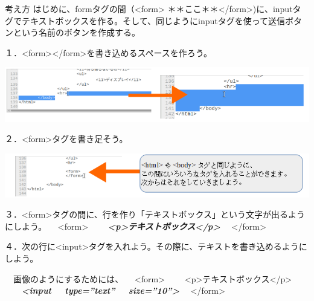 \documentclass[a4paper,12pt,dvipdfmx]{jarticle}
\begin{document}
考え方\newline
はじめに、formタグの間（{\textless}form{\textgreater}
＊＊ここ＊＊{\textless}/form{\textgreater})に、inputタグでテキストボックスを作る。そして、同じようにinputタグを使って送信ボタンという名前のボタンを作成する。

１．{\textless}form{\textgreater}{\textless}/form{\textgreater}を書き込めるスペースを作ろう。



\centering
\includegraphics[width=17.006cm]{ome7-img035.png}
\flushleft

２．{\textless}form{\textgreater}タグを書き足そう。



\centering
\includegraphics[width=17.006cm]{ome7-img036.png}
\flushleft


\bigskip


\bigskip

３．{\textless}form{\textgreater}タグの間に、行を作り「テキストボックス」という文字が出るようにしよう。\newline
\ \ {\textless}form{\textgreater}\newline
\ \ \ \ \textbf{\textit{{\textless}p{\textgreater}テキストボックス{\textless}/p{\textgreater}}}\newline
\ \ {\textless}/form{\textgreater}

４．次の行に{\textless}input{\textgreater}タグを入れよう。その際に、テキストを書き込めるようにしよう。

\ \ 画像のようにするためには、\newline
\ \ {\textless}form{\textgreater}\newline
\ \ \ \ {\textless}p{\textgreater}テキストボックス{\textless}/p{\textgreater}\newline
\ \ \ \ \textbf{\textit{{\textless}input \ \ type=”text” \ \ size=”10”{\textgreater}}}\newline
\ \ {\textless}/form{\textgreater}
\end{document}
